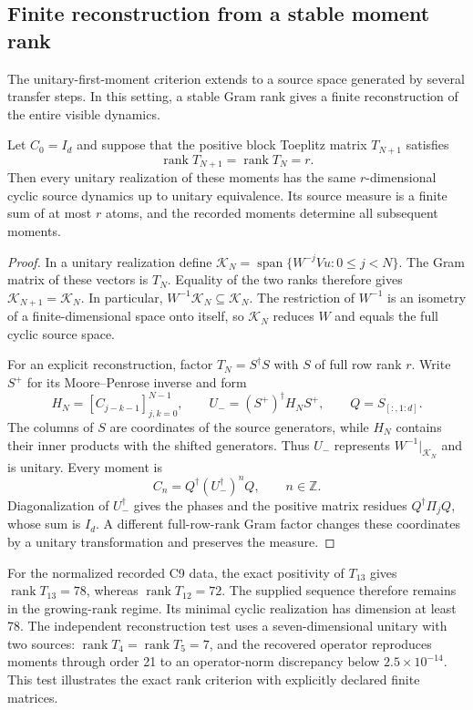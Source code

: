 \subsection{Finite reconstruction from a stable moment rank}
\label{sec:flat-reconstruction}
The unitary-first-moment criterion extends to a source space generated by several transfer steps. In this setting, a stable Gram rank gives a finite reconstruction of the entire visible dynamics.
\begin{proposition}\label{prop:flat-rank}
Let $C_0=I_d$ and suppose that the positive block Toeplitz matrix $T_{N+1}$ satisfies
\[
\operatorname{rank}T_{N+1}=\operatorname{rank}T_N=r.
\]
Then every unitary realization of these moments has the same $r$-dimensional cyclic source dynamics up to unitary equivalence. Its source measure is a finite sum of at most $r$ atoms, and the recorded moments determine all subsequent moments.
\end{proposition}
\begin{proof}
In a unitary realization define $\mathcal K_N=\operatorname{span}\{W^{-j}Vu:0\leq j<N\}$. The Gram matrix of these vectors is $T_N$. Equality of the two ranks therefore gives $\mathcal K_{N+1}=\mathcal K_N$. In particular, $W^{-1}\mathcal K_N\subseteq\mathcal K_N$. The restriction of $W^{-1}$ is an isometry of a finite-dimensional space onto itself, so $\mathcal K_N$ reduces $W$ and equals the full cyclic source space.

For an explicit reconstruction, factor $T_N=S^\dagger S$ with $S$ of full row rank $r$. Write $S^+$ for its Moore--Penrose inverse and form
\[
H_N=[C_{j-k-1}]_{j,k=0}^{N-1},\qquad
U_-=(S^+)^\dagger H_NS^+,\qquad Q=S_{[:,1:d]}.
\]
The columns of $S$ are coordinates of the source generators, while $H_N$ contains their inner products with the shifted generators. Thus $U_-$ represents $W^{-1}|_{\mathcal K_N}$ and is unitary. Every moment is
\begin{equation}\label{eq:flat-reconstruction}
C_n=Q^\dagger(U_-^\dagger)^nQ,\qquad n\in\mathbb Z.
\end{equation}
Diagonalization of $U_-^\dagger$ gives the phases and the positive matrix residues $Q^\dagger\Pi_jQ$, whose sum is $I_d$. A different full-row-rank Gram factor changes these coordinates by a unitary transformation and preserves the measure.
\end{proof}
For the normalized recorded C9 data, the exact positivity of $T_{13}$ gives $\operatorname{rank}T_{13}=78$, whereas $\operatorname{rank}T_{12}=72$. The supplied sequence therefore remains in the growing-rank regime. Its minimal cyclic realization has dimension at least 78. The independent reconstruction test uses a seven-dimensional unitary with two sources: $\operatorname{rank}T_4=\operatorname{rank}T_5=7$, and the recovered operator reproduces moments through order 21 to an operator-norm discrepancy below $2.5\times10^{-14}$. This test illustrates the exact rank criterion with explicitly declared finite matrices.

